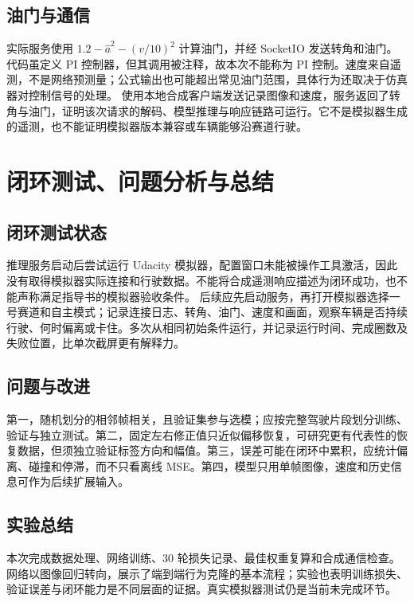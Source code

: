 \documentclass[UTF8,zihao=-4,fontset=windows]{ctexart}
\begin{document}
\subsection{油门与通信}
实际服务使用 $1.2-\hat a^2-(v/10)^2$ 计算油门，并经 SocketIO 发送转角和油门。代码虽定义 PI 控制器，但其调用被注释，故本次不能称为 PI 控制。速度来自遥测，不是网络预测量；公式输出也可能超出常见油门范围，具体行为还取决于仿真器对控制信号的处理。
使用本地合成客户端发送记录图像和速度，服务返回了转角与油门，证明该次请求的解码、模型推理与响应链路可运行。它不是模拟器生成的遥测，也不能证明模拟器版本兼容或车辆能够沿赛道行驶。
\newpage
\section{闭环测试、问题分析与总结}
\subsection{闭环测试状态}
推理服务启动后尝试运行 Udacity 模拟器，配置窗口未能被操作工具激活，因此没有取得模拟器实际连接和行驶数据。不能将合成遥测响应描述为闭环成功，也不能声称满足指导书的模拟器验收条件。
后续应先启动服务，再打开模拟器选择一号赛道和自主模式；记录连接日志、转角、油门、速度和画面，观察车辆是否持续行驶、何时偏离或卡住。多次从相同初始条件运行，并记录运行时间、完成圈数及失败位置，比单次截屏更有解释力。
\subsection{问题与改进}
第一，随机划分的相邻帧相关，且验证集参与选模；应按完整驾驶片段划分训练、验证与独立测试。第二，固定左右修正值只近似偏移恢复，可研究更有代表性的恢复数据，但须独立验证标签方向和幅值。第三，误差可能在闭环中累积，应统计偏离、碰撞和停滞，而不只看离线 MSE。第四，模型只用单帧图像，速度和历史信息可作为后续扩展输入。
\subsection{实验总结}
本次完成数据处理、网络训练、30 轮损失记录、最佳权重复算和合成通信检查。网络以图像回归转向，展示了端到端行为克隆的基本流程；实验也表明训练损失、验证误差与闭环能力是不同层面的证据。真实模拟器测试仍是当前未完成环节。
\end{document}
